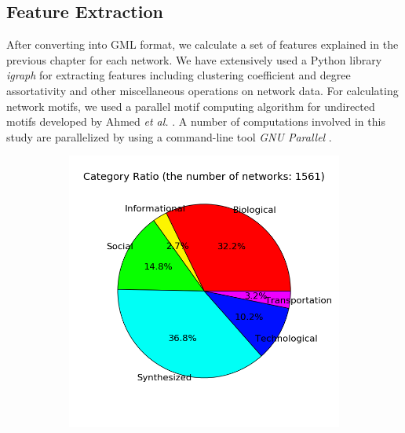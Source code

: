 \documentclass[..]{revtex4}
\begin{document}
	\subsection{Feature Extraction}
	After converting into GML format, we calculate a set of features explained in the previous chapter for each network. We have extensively used a Python library \textit{igraph} \cite{igraph} for extracting features including clustering coefficient and degree assortativity and other miscellaneous operations on network data. For calculating network motifs, we used a parallel motif computing algorithm for undirected motifs developed by Ahmed \textit{et al.} \cite{ahmed2015icdm}. A number of computations involved in this study are parallelized by using a command-line tool \textit{GNU Parallel} \cite{GNUParallel}.

\begin{figure}[H]
\begin{subfigure}{0.40\textwidth}
\includegraphics[width=\linewidth]{figs/category_ratio.png}
\caption{}\label{domain_ratio}
\end{subfigure}\hspace*{\fill}
\begin{subfigure}{0.45\textwidth}

\end{subfigure}
\end{figure}
\end{document}
